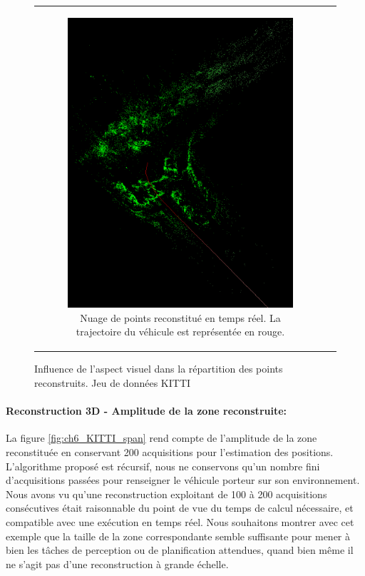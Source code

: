 \begin{figure}
{\begin{tabular}  {c c}
\begin{subfigure}{0.6\textwidth}
				\includegraphics[width=\textwidth]{Chapter6/graphics/screenshot3_crop.png} 
				\caption{Nuage de points reconstitué en temps réel. La trajectoire du véhicule est représentée en rouge.}
			\end{subfigure}
		\end{tabular}
	}
	\caption{Influence de l'aspect visuel dans la répartition des points reconstruits. Jeu de données \og KITTI\fg{} \cite{Geiger2012}}
	\label{fig:ch6_KITTI_3D}
\end{figure}


\paragraph{Reconstruction 3D - Amplitude de la zone reconstruite:\\}
La figure \ref{fig:ch6_KITTI_span} rend compte de l'amplitude de la zone reconstituée en conservant 200 acquisitions pour l'estimation des positions. \\
L'algorithme proposé est récursif, nous ne conservons qu'un nombre fini d'acquisitions passées pour renseigner le véhicule porteur sur son environnement. Nous avons vu qu'une reconstruction exploitant de 100 à 200 acquisitions consécutives était raisonnable du point de vue du temps de calcul nécessaire, et compatible avec une exécution en temps réel. Nous souhaitons montrer avec cet exemple que la taille de la zone correspondante semble suffisante pour mener à bien les tâches de perception ou de planification attendues, quand bien même il ne s'agit pas d'une reconstruction à grande échelle.

